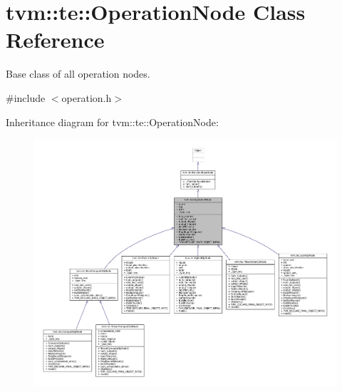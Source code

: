 \hypertarget{classtvm_1_1te_1_1OperationNode}{}\section{tvm\+:\+:te\+:\+:Operation\+Node Class Reference}
\label{classtvm_1_1te_1_1OperationNode}


Base class of all operation nodes.  




{\ttfamily \#include $<$operation.\+h$>$}



Inheritance diagram for tvm\+:\+:te\+:\+:Operation\+Node\+:
\nopagebreak
\begin{figure}[H]
\begin{center}
\leavevmode
\includegraphics[width=350pt]{classtvm_1_1te_1_1OperationNode__inherit__graph}
\end{center}
\end{figure}


